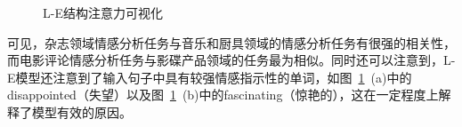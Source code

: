 \begin{figure}[htb]
\centering


\caption{L-E结构注意力可视化}
\label{fig:l-e-attn}
\end{figure}

可见，杂志领域情感分析任务与音乐和厨具领域的情感分析任务有很强的相关性，而电影评论情感分析任务与影碟产品领域的任务最为相似。同时还可以注意到，L-E模型还注意到了输入句子中具有较强情感指示性的单词，如图~\ref{fig:l-e-attn}~(a)中的disappointed（失望）以及图~\ref{fig:l-e-attn}~(b)中的fascinating（惊艳的），这在一定程度上解释了模型有效的原因。